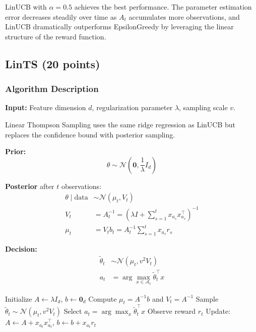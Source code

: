 \documentclass[11pt]{article}
\begin{document}
LinUCB with $\alpha = 0.5$ achieves the best performance. The parameter estimation error decreases steadily over time as $A_t$ accumulates more observations, and LinUCB dramatically outperforms EpsilonGreedy by leveraging the linear structure of the reward function.

\subsection{LinTS (20 points)}

\subsubsection{Algorithm Description}

\textbf{Input:} Feature dimension $d$, regularization parameter $\lambda$, sampling scale $v$.

Linear Thompson Sampling uses the same ridge regression as LinUCB but replaces the confidence bound with posterior sampling.

\textbf{Prior:}
\[
\theta \sim \mathcal{N}\left(\mathbf{0}, \frac{1}{\lambda} I_d\right)
\]

\textbf{Posterior} after $t$ observations:
\begin{align}
\theta \mid \text{data} &\sim \mathcal{N}(\mu_t, V_t) \\
V_t &= A_t^{-1} = \left(\lambda I + \sum_{s=1}^{t} x_{a_s} x_{a_s}^\top\right)^{-1} \label{eq:lints_V} \\
\mu_t &= V_t b_t = A_t^{-1} \sum_{s=1}^{t} x_{a_s} r_s \label{eq:lints_mu}
\end{align}

\textbf{Decision:}
\begin{align}
\tilde{\theta}_t &\sim \mathcal{N}(\mu_t, v^2 V_t) \label{eq:lints_sample} \\
a_t &= \arg\max_{x \in \mathcal{A}_t} \tilde{\theta}_t^\top x \label{eq:lints_decision}
\end{align}

\begin{algorithm}[H]
\caption{LinTS}
\begin{algorithmic}[1]
\State Initialize $A \leftarrow \lambda I_d$, $b \leftarrow \mathbf{0}_d$
    \State Compute $\mu_t = A^{-1} b$ and $V_t = A^{-1}$
    \State Sample $\tilde{\theta}_t \sim \mathcal{N}(\mu_t, v^2 V_t)$
    \State Select $a_t = \arg\max_x \tilde{\theta}_t^\top x$
    \State Observe reward $r_t$
    \State Update: $A \leftarrow A + x_{a_t} x_{a_t}^\top$, \quad $b \leftarrow b + x_{a_t} r_t$
\EndFor
\end{algorithmic}
\end{algorithm}
\end{document}
